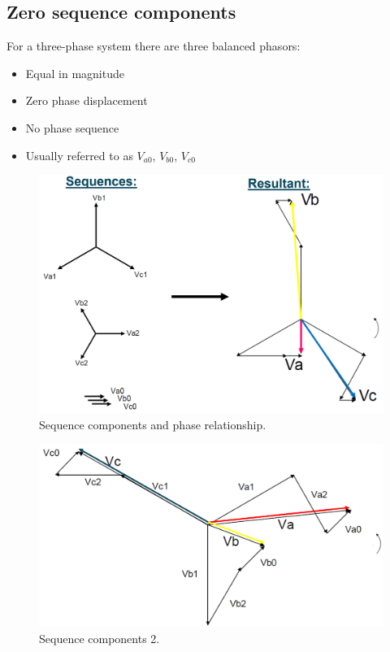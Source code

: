 \documentclass[class=report, crop=false, 12pt,a4paper]{standalone}
\begin{document}
\subsection{Zero sequence components}
For a three-phase system there are three balanced phasors:
\begin{itemize}
	\item Equal in magnitude
	\item Zero phase displacement
	\item No phase sequence
	\item Usually referred to as $V_{a0}$, $V_{b0}$, $V_{c0}$
\end{itemize}
\begin{figure}[H]
	\centering
	\includegraphics[width = \textwidth]{../img/figure22.png}
	\caption{Sequence components and phase relationship.}
\end{figure}
\begin{figure}[H]
	\centering
	\includegraphics[width = \textwidth]{../img/figure23.png}
	\caption{Sequence components 2.}
\end{figure}
\end{document}
